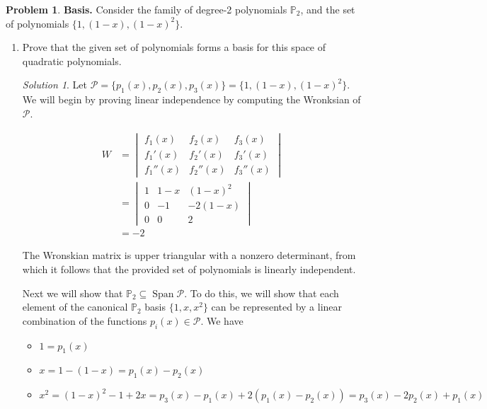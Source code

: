 \documentclass[12pt,a4paper]{article}
\theoremstyle{definition}
\newtheorem{problem}{Problem}
\theoremstyle{remark}
\newtheorem*{solution}{Solution}
\begin{document}
\begin{problem}
    \textbf{Basis.} Consider the family of degree-2 polynomials $\mathbb P_2$, and the set of polynomials $\{1, (1-x), (1-x)^2\}$. 
    \begin{enumerate}
        \item Prove that the given set of polynomials forms a basis for this space of quadratic polynomials. 
        \begin{solution}
            Let $\mathcal P = \{p_1(x), p_2(x),p_3(x)\} =\{1, (1-x), (1-x)^2\}$.  We will begin by proving linear independence by computing the Wronksian of $\mathcal P$. 

            \begin{align*}
                W &= \begin{vmatrix}
                        f_1(x) & f_2(x) & f_3(x) \\
                        f_1'(x) & f_2'(x) & f_3'(x) \\
                        f_1''(x) & f_2''(x) & f_3''(x) 
                \end{vmatrix} \\
                &= \begin{vmatrix}
                    1 & 1-x & (1-x)^2 \\
                    0 & -1 & -2(1-x) \\
                    0 & 0 & 2
                \end{vmatrix} \\
                &= -2
            \end{align*}

        The Wronskian matrix is upper triangular with a nonzero determinant, from which it follows that the provided set of polynomials is linearly independent. 

        Next we will show that $\mathbb P_2 \subseteq \operatorname{Span} \mathcal P$. To do this, we will show that each element of the canonical $\mathbb P_2$ basis $\{1, x, x^2\}$ can be represented by a linear combination of the functions $p_i(x) \in \mathcal P$. We have 

        \begin{itemize}
            \item $1 = p_1(x)$ 
            \item $x = 1-(1-x) = p_1(x) -p_2(x)$
            \item $x^2 = (1-x)^2-1+2x = p_3(x) - p_1(x) + 2(p_1(x) - p_2(x)) = p_3(x) - 2 p_2(x) + p_1(x)$
        \end{itemize}


\end{solution}
\end{enumerate}
\end{problem}
\end{document}
